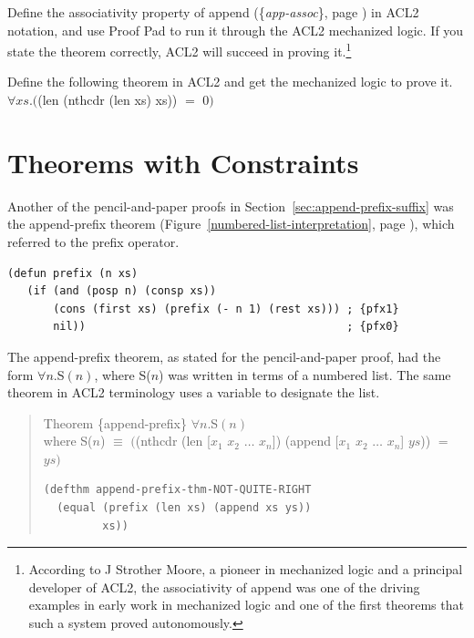\begin{ExerciseList}

\Exercise Define the
associativity property 
of \textsf{append} (\{\emph{app-assoc}\}, page \pageref{app-assoc})
in ACL2 notation,
and use Proof Pad to run it through the ACL2 mechanized logic.
If you state the theorem correctly, ACL2 will succeed in proving it.\footnote{According
to J Strother Moore, a pioneer
in mechanized logic and a principal developer of ACL2,
the associativity of \textsf{append} was one of the driving examples in early work in
mechanized logic and one of the first theorems that such a system proved autonomously.}

\Exercise Define the following theorem in ACL2 and get the mechanized logic to prove it.\\
\hspace*{16mm}$\forall xs.($\textsf{(len (nthcdr (len xs) xs))} $=$ $0)$

\end{ExerciseList}

\section{Theorems with Constraints}
\label{sec:implies-constraints}

Another of the pencil-and-paper proofs in Section~\ref{sec:append-prefix-suffix}
was the append-prefix theorem
(Figure~\ref{numbered-list-interpretation}, page \pageref{numbered-list-interpretation}),
which referred to the prefix operator.

\begin{Verbatim}
(defun prefix (n xs)
   (if (and (posp n) (consp xs))
       (cons (first xs) (prefix (- n 1) (rest xs))) ; {pfx1}
       nil))                                        ; {pfx0}
\end{Verbatim}

The append-prefix theorem, as stated for the pencil-and-paper proof,
had the form $\forall n.$S$(n)$,
where S($n$)
was written in terms of a numbered list.
The same theorem in ACL2 terminology uses a variable to designate the list.
\begin{samepage}
\begin{quote}
Theorem \{append-prefix\} $\forall n.$S$(n)$ \\
where S($n$) $\equiv$ $($\textsf{(nthcdr (len [$x_1$ $x_2$ $\dots$ $x_n$]) (append [$x_1$ $x_2$ $\dots$ $x_n$] $ys$))} $=$ $ys)$
\begin{Verbatim}
(defthm append-prefix-thm-NOT-QUITE-RIGHT
  (equal (prefix (len xs) (append xs ys))
         xs))
\end{Verbatim}
\end{quote}
\end{samepage}

